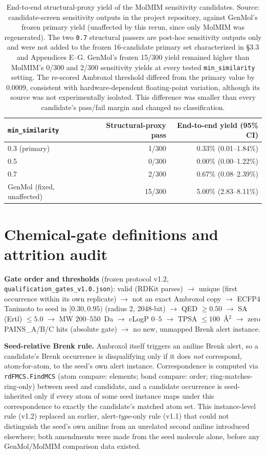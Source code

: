 \documentclass{article}
\begin{document}
\begin{table}[h]
\centering
\footnotesize
\begin{tabular}{lrr}
\toprule
\texttt{min\_similarity} & Structural-proxy pass & End-to-end yield (95\% CI) \\
\midrule
0.3 (primary) & 1/300 & 0.33\% (0.01--1.84\%) \\
0.5 & 0/300 & 0.00\% (0.00--1.22\%) \\
0.7 & 2/300 & 0.67\% (0.08--2.39\%) \\
\midrule
GenMol (fixed, unaffected) & 15/300 & 5.00\% (2.83--8.11\%) \\
\bottomrule
\end{tabular}
\caption{End-to-end structural-proxy yield of the MolMIM sensitivity candidates. Source: candidate-screen sensitivity outputs in the project repository, against GenMol's frozen primary yield (unaffected by this rerun, since only MolMIM was regenerated). The two \texttt{0.7} structural passers are post-hoc sensitivity outputs only and were not added to the frozen 16-candidate primary set characterized in \S3.3 and Appendices E--G. GenMol's frozen 15/300 yield remained higher than MolMIM's 0/300 and 2/300 sensitivity yields at every tested \texttt{min\_similarity} setting. The re-scored Ambroxol threshold differed from the primary value by 0.0009, consistent with hardware-dependent floating-point variation, although its source was not experimentally isolated. This difference was smaller than every candidate's pass/fail margin and changed no classification.}
\end{table}

\FloatBarrier
\section{Chemical-gate definitions and attrition audit}
\label{app:b}

\textbf{Gate order and thresholds} (frozen protocol v1.2, \texttt{qualification\_gates\_v1.0.json}): valid (RDKit parses) $\to$ unique (first occurrence within its own replicate) $\to$ not an exact Ambroxol copy $\to$ ECFP4 Tanimoto to seed in $[0.30,0.95)$ (radius 2, 2048-bit) $\to$ QED $\geq 0.50$ $\to$ SA (Ertl) $\leq 5.0$ $\to$ MW $200$--$550$~Da $\to$ cLogP $0$--$5$ $\to$ TPSA $\leq 100$~\AA$^2$ $\to$ zero PAINS\_A/B/C hits (absolute gate) $\to$ no new, unmapped Brenk alert instance.

\textbf{Seed-relative Brenk rule.} Ambroxol itself triggers an aniline Brenk alert, so a candidate's Brenk occurrence is disqualifying only if it does \emph{not} correspond, atom-for-atom, to the seed's own alert instance. Correspondence is computed via \texttt{rdFMCS.FindMCS} (atom compare: elements; bond compare: order; ring-matches-ring-only) between seed and candidate, and a candidate occurrence is seed-inherited only if every atom of some seed instance maps under this correspondence to exactly the candidate's matched atom set. This instance-level rule (v1.2) replaced an earlier, alert-\emph{type}-only rule (v1.1) that could not distinguish the seed's own aniline from an unrelated second aniline introduced elsewhere; both amendments were made from the seed molecule alone, before any GenMol/MolMIM comparison data existed.
\end{document}

